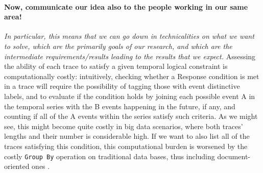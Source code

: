 

\medskip


\paragraph*{Now, communicate our idea also to the people working in our same area!} \textit{In particular, this means that we can go down in technicalities on what we want to solve, which are the primarily goals of our research, and which are the intermediate requirements/results leading to the results that we expect.} 
Assessing the ability of each trace to satisfy a given temporal logical constraint is computationally costly: intuitively, checking whether a \textsf{Response} condition is met in a trace will require the possibility of tagging those with event distinctive labels, and to evaluate if the condition holds by joining each possible event A in the temporal series with the B events happening in the future, if any, and counting if all of the A events within the series satisfy such criteria. As we might see, this might become quite costly in big data scenarios, where both traces' lengths and their number is considerable high. If we want to also list all of the traces satisfying this condition, this computational burden is worsened by the costly \texttt{Group By} operation on traditional data bases, thus including document-oriented ones \cite{THoSP}.


